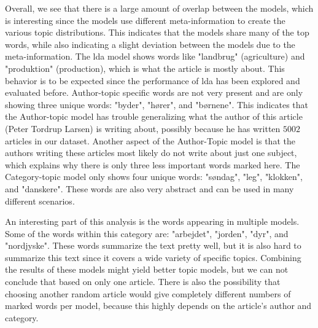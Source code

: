 Overall, we see that there is a large amount of overlap between the models, which is interesting since the models use different meta-information to create the various topic distributions.
This indicates that the models share many of the top words, while also indicating a slight deviation between the models due to the meta-information.
The \gls{lda} model shows words like "landbrug" (agriculture) and "produktion" (production), which is what the article is mostly about.
This behavior is to be expected since the performance of \gls{lda} has been explored and evaluated before. 
Author-topic specific words are not very present and are only showing three unique words: "byder", "hører", and "børnene".
This indicates that the Author-topic model has trouble generalizing what the author of this article (Peter Tordrup Larsen) is writing about, possibly because he has written $5002$ articles in our dataset.
Another aspect of the Author-Topic model is that the authors writing these articles most likely do not write about just one subject, which explains why there is only three less important words marked here. 
The Category-topic model only shows four unique words: "søndag", "leg", "klokken", and "danskere".
These words are also very abstract and can be used in many different scenarios.

An interesting part of this analysis is the words appearing in multiple models.
Some of the words within this category are: "arbejdet", "jorden", "dyr", and "nordjyske".
These words summarize the text pretty well, but it is also hard to summarize this text since it covers a wide variety of specific topics.
Combining the results of these models might yield better topic models, but we can not conclude that based on only one article.
There is also the possibility that choosing another random article would give completely different numbers of marked words per model, because this highly depends on the article's author and category.



